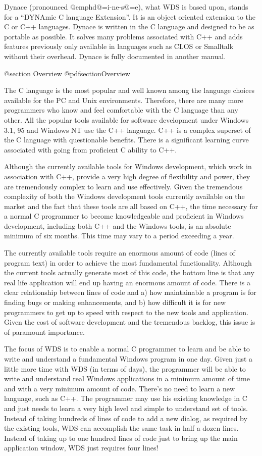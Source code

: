 Dynace (pronounced @emph{d@=i-ne-s@=e}), what WDS is based upon, stands
for a ``DYNAmic C language Extension''.  It is an object oriented
extension to the C or C++ languages.  Dynace is written in the C
language and designed to be as portable as possible.  It solves many
problems associated with C++ and adds features previously only available
in languages such as CLOS or Smalltalk without their overhead.  Dynace
is fully documented in another manual.

@section Overview
@pdfsection{Overview}

The C language is the most popular and well known among the language
choices available for the PC and Unix environments.  Therefore, there
are many more programmers who know and feel comfortable with the C
language than any other.  All the popular tools available for software
development under Windows 3.1, 95 and Windows NT use the C++
language. C++ is a complex superset of the C language with questionable
benefits.  There is a significant learning curve associated with going
from proficient C ability to C++.


Although the currently available tools for Windows development, which
work in association with C++, provide a very high degree of flexibility
and power, they are tremendously complex to learn and use effectively.
Given the tremendous complexity of both the Windows development tools
currently available on the market and the fact that these tools are all
based on C++, the time necessary for a normal C programmer to become
knowledgeable and proficient in Windows development, including both C++
and the Windows tools, is an absolute minimum of six months.  This time
may vary to a period exceeding a year.

The currently available tools require an enormous amount of code (lines
of program text) in order to achieve the most fundamental functionality.
Although the current tools actually generate most of this code, the
bottom line is that any real life application will end up having an
enormous amount of code.  There is a clear relationship between lines of
code and a) how maintainable a program is for finding bugs or making
enhancements, and b) how difficult it is for new programmers to get up
to speed with respect to the new tools and application.  Given the cost
of software development and the tremendous backlog, this issue is of
paramount importance.

The focus of WDS is to enable a normal C programmer to learn and be able
to write and understand a fundamental Windows program in one day.  Given
just a little more time with WDS (in terms of days), the programmer will
be able to write and understand real Windows applications in a minimum
amount of time and with a very minimum amount of code.  There's no need
to learn a new language, such as C++.  The programmer may use his
existing knowledge in C and just needs to learn a very high level and
simple to understand set of tools.  Instead of taking hundreds of lines
of code to add a new dialog, as required by the existing tools, WDS can
accomplish the same task in half a dozen lines.  Instead of taking up to
one hundred lines of code just to bring up the main application window,
WDS just requires four lines!

